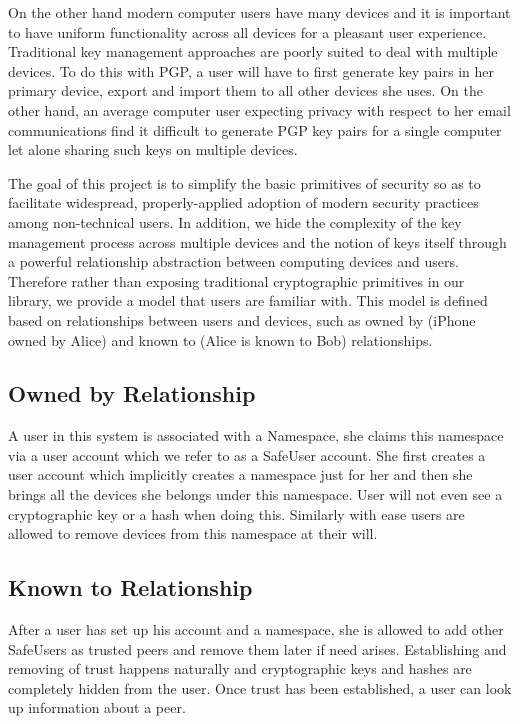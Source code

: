 On the other hand modern computer users have many devices and it is important to have uniform functionality across all devices for a pleasant user experience.
Traditional key management approaches are poorly suited to deal with multiple devices. To do this with PGP, a user will have to first generate key pairs in her primary device, export and import them to all other devices she uses. On the other hand, an average computer user expecting privacy with respect to her email communications find it difficult to generate PGP key pairs for a single computer \cite{Jhonny} let alone sharing such keys on multiple devices.

The goal of this project is to simplify the basic primitives of security so as to facilitate widespread, properly-applied adoption of modern security practices among non-technical users. In addition, we hide the complexity of the key management process across multiple devices and the notion of keys itself through a powerful relationship abstraction between computing devices and users. Therefore rather than exposing traditional cryptographic primitives in our library, we provide a model that users are familiar with. This model is defined based on relationships between users and devices, such as owned by (iPhone owned by Alice) and known to (Alice is known to Bob) relationships.

\subsection{Owned by Relationship}
A user in this system is associated with a Namespace, she claims this namespace via a user account which we refer to as a SafeUser account. She first creates a user account which implicitly creates a namespace just for her and then she brings all the devices she belongs under this namespace. User will not even see a cryptographic key or a hash when doing this. Similarly with ease users are allowed to remove devices from this namespace at their will.

\subsection{Known to Relationship}
After a user has set up his account and a namespace, she is allowed to add other SafeUsers as trusted peers and remove them later if need arises. Establishing and removing of trust happens naturally and  cryptographic keys and hashes are completely hidden from the user. Once trust has been established, a user can look up information about a peer.

